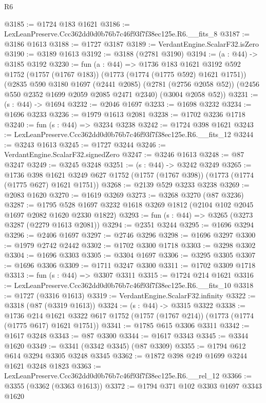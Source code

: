 \begin{lexlean}{R6}
\begin{coremodule}
@3185 := @1724 @183 @1621
@3186 := LexLeanPreserve.Ccc362dd0d0b76b7c46f93f7f38ec125e.R6.__fits_8
@3187 := @3186 @1613
@3188 := @1727 @3187
@3189 := VerdantEngine.ScalarF32.isZero
@3190 := @3189 @1613
@3192 := @3188 (@2781 @3190)
@3194 := (a : @44) -> @3185 @3192
@3230 := fun (a : @44) =>
  @1736
    @183
    @1621
    @3192
    @592
    @1752
    (@1757 (@1767 @183))
    (@1773 (@1774 (@1775 @592) @1621 @1751))
    (@2835
      @590
      @3180
      @1697
      (@2441 @2085)
      (@2781 (@2756 @2058 @52))
      (@2456 @550 @2352 @1699 @2059 @2085 @2471 @2340)
      (@3004 @2058 @52))
@3231 := (s : @44) -> @1694
@3232 := @2046 @1697
@3233 := @1698 @3232
@3234 := @1696 @3233
@3236 := @1979 @1613 @2081
@3238 := @1702 @3236 @1718
@3240 := fun (s : @44) => @3234 @3238
@3242 := @1724 @398 @1621
@3243 := LexLeanPreserve.Ccc362dd0d0b76b7c46f93f7f38ec125e.R6.__fits_12
@3244 := @3243 @1613
@3245 := @1727 @3244
@3246 := VerdantEngine.ScalarF32.signedZero
@3247 := @3246 @1613
@3248 := @87 @3247
@3249 := @3245 @3248
@3251 := (s : @44) -> @3242 @3249
@3265 := @1736
    @398
    @1621
    @3249
    @627
    @1752
    (@1757 (@1767 @398))
    (@1773 (@1774 (@1775 @627) @1621 @1751))
@3268 := @2139 @529 @3233 @3238
@3269 := @2083 @1620
@3270 := @1619 @3269
@3273 := @3268 @3270 (@87 @3236)
@3287 := @1795 @528 @1697 @3232 @1618 @3269 @1812 (@2104 @102 @2045 @1697 @2082 @1620 @2330 @1822)
@3293 := fun (s : @44) => @3265 (@3273 @3287 (@2279 @1613 @2081))
@3294 := @2351 @3244
@3295 := @1696 @3294
@3296 := @2406 @1697
@3297 := @2746 @3296
@3298 := @1696 @3297
@3300 := @1979 @2742 @2442
@3302 := @1702 @3300 @1718
@3303 := @3298 @3302
@3304 := @1696 @3303
@3305 := @3304 @1697
@3306 := @3295 @3305
@3307 := @1696 @3306
@3309 := @1711 @3247 @3300
@3311 := @1702 @3309 @1718
@3313 := fun (s : @44) => @3307 @3311
@3315 := @1724 @214 @1621
@3316 := LexLeanPreserve.Ccc362dd0d0b76b7c46f93f7f38ec125e.R6.__fits_10
@3318 := @1727 (@3316 @1613)
@3319 := VerdantEngine.ScalarF32.infinity
@3322 := @3318 (@87 (@3319 @1613))
@3324 := (s : @44) -> @3315 @3322
@3338 := @1736
    @214
    @1621
    @3322
    @617
    @1752
    (@1757 (@1767 @214))
    (@1773 (@1774 (@1775 @617) @1621 @1751))
@3341 := @1785 @615 @3306 @3311
@3342 := @1617 @3248
@3343 := @87 @3300
@3344 := @1617 @3343
@3345 := @3344 @1620
@3349 := @3341 (@3342 @3345) (@87 @3309)
@3355 := @1794 @612 @614 @3294 @3305 @3248 @3345
@3362 := @1872 @398 @249 @1699 @3244 @1621 @3248 @1823
@3363 := LexLeanPreserve.Ccc362dd0d0b76b7c46f93f7f38ec125e.R6.__rel_12
@3366 := @3355 (@3362 (@3363 @1613))
@3372 := @1794 @371 @102 @3303 @1697 @3343 @1620

\end{coremodule}
\end{lexlean}
